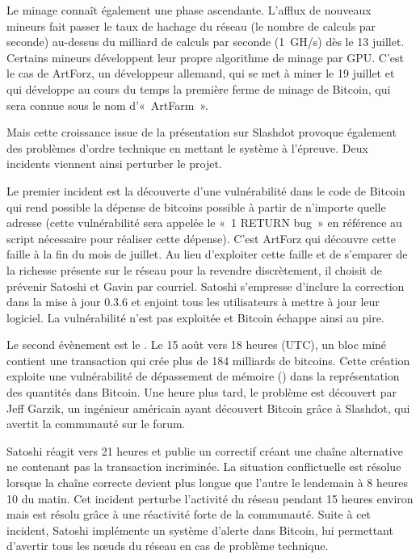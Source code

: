 Le minage connaît également une phase ascendante. L'afflux de nouveaux mineurs fait passer le taux de hachage du réseau (le nombre de calculs par seconde) au-dessus du milliard de calculs par seconde (1~GH/s) dès le 13 juillet. Certains mineurs développent leur propre algorithme de minage par GPU. C'est le cas de ArtForz, un développeur allemand, qui se met à miner le 19 juillet et qui développe au cours du temps la première ferme de minage de Bitcoin, qui sera connue sous le nom d'«~ArtFarm~».


Mais cette croissance issue de la présentation sur Slashdot provoque également des problèmes d'ordre technique en mettant le système à l'épreuve. Deux incidents viennent ainsi perturber le projet.

Le premier incident est la découverte d'une vulnérabilité dans le code de Bitcoin qui rend possible la dépense de bitcoins possible à partir de n'importe quelle adresse (cette vulnérabilité sera appelée le «~1 RETURN bug~» en référence au script nécessaire pour réaliser cette dépense). C'est ArtForz qui découvre cette faille à la fin du mois de juillet. Au lieu d'exploiter cette faille et de s'emparer de la richesse présente sur le réseau pour la revendre discrètement, il choisit de prévenir Satoshi et Gavin par courriel. Satoshi s'empresse d'inclure la correction dans la mise à jour 0.3.6 et enjoint tous les utilisateurs à mettre à jour leur logiciel. La vulnérabilité n'est pas exploitée et Bitcoin échappe ainsi au pire.

Le second évènement est le . Le 15 août vers 18 heures (UTC), un bloc miné contient une transaction qui crée plus de 184 milliards de bitcoins. Cette création exploite une vulnérabilité de dépassement de mémoire () dans la représentation des quantités dans Bitcoin. Une heure plus tard, le problème est découvert par Jeff Garzik, un ingénieur américain ayant découvert Bitcoin grâce à Slashdot, qui avertit la communauté sur le forum.

Satoshi réagit vers 21 heures et publie un correctif créant une chaîne alternative ne contenant pas la transaction incriminée. La situation conflictuelle est résolue lorsque la chaîne correcte devient plus longue que l'autre le lendemain à 8 heures 10 du matin. Cet incident perturbe l'activité du réseau pendant 15 heures environ mais est résolu grâce à une réactivité forte de la communauté. Suite à cet incident, Satoshi implémente un système d'alerte dans Bitcoin, lui permettant d'avertir tous les nœuds du réseau en cas de problème technique. 

